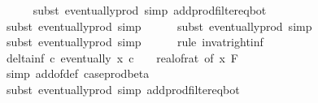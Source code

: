 \begin{isabellebody}
\ \ \ \ \isamarkupfalse%
\ {\isacharparenleft}{\kern0pt}subst\ eventually{\isacharunderscore}{\kern0pt}prod{}{\isacharprime}{\kern0pt}{\isacharcomma}{\kern0pt}\ simp\ add{\isacharcolon}{\kern0pt}prod{\isacharunderscore}{\kern0pt}filter{\isacharunderscore}{\kern0pt}eq{\isacharunderscore}{\kern0pt}bot{\isacharparenright}{\kern0pt}\isanewline
\ \ \ \ \isamarkupfalse%
\ {\isacharparenleft}{\kern0pt}subst\ eventually{\isacharunderscore}{\kern0pt}prod{}{\isacharprime}{\kern0pt}{\isacharcomma}{\kern0pt}\ simp{\isacharparenright}{\kern0pt}\isanewline
\ \ \ \ \isamarkupfalse%
\ {\isacharparenleft}{\kern0pt}subst\ eventually{\isacharunderscore}{\kern0pt}prod{}{\isacharprime}{\kern0pt}{\isacharcomma}{\kern0pt}\ simp{\isacharparenright}{\kern0pt}\isanewline
\ \ \ \ \isamarkupfalse%
\ {\isacharparenleft}{\kern0pt}subst\ eventually{\isacharunderscore}{\kern0pt}prod{}{\isacharprime}{\kern0pt}{\isacharcomma}{\kern0pt}\ simp{\isacharparenright}{\kern0pt}\isanewline
\ \ \ \ \isamarkupfalse%
\ {\isacharparenleft}{\kern0pt}rule\ inv{\isacharunderscore}{\kern0pt}at{\isacharunderscore}{\kern0pt}right{\isacharunderscore}{\kern0pt}{}{\isacharunderscore}{\kern0pt}inf{\isacharparenright}{\kern0pt}\isanewline
\isanewline
\ \ \isamarkupfalse%
\ delta{\isacharunderscore}{\kern0pt}inf{\isacharcolon}{\kern0pt}\ {\isachardoublequoteopen}{\isasymAnd}c{\isachardot}{\kern0pt}\ eventually\ {\isacharparenleft}{\kern0pt}{\isasymlambda}x{\isachardot}{\kern0pt}\ c\ {\isasymle}\ {}\ {\isacharslash}{\kern0pt}\ {\isacharparenleft}{\kern0pt}real{\isacharunderscore}{\kern0pt}of{\isacharunderscore}{\kern0pt}rat\ {\isacharparenleft}{\kern0pt}{\isasymdelta}{\isacharunderscore}{\kern0pt}of\ x{\isacharparenright}{\kern0pt}{\isacharparenright}{\kern0pt}{\isacharparenright}{\kern0pt}\ {\isacharquery}{\kern0pt}F{\isachardoublequoteclose}\isanewline
\ \ \ \ \isamarkupfalse%
\ {\isacharparenleft}{\kern0pt}simp\ add{\isacharcolon}{\kern0pt}{\isasymdelta}{\isacharunderscore}{\kern0pt}of{\isacharunderscore}{\kern0pt}def\ case{\isacharunderscore}{\kern0pt}prod{\isacharunderscore}{\kern0pt}beta{\isacharprime}{\kern0pt}{\isacharparenright}{\kern0pt}\isanewline
\ \ \ \ \isamarkupfalse%
\ {\isacharparenleft}{\kern0pt}subst\ eventually{\isacharunderscore}{\kern0pt}prod{}{\isacharprime}{\kern0pt}{\isacharcomma}{\kern0pt}\ simp\ add{\isacharcolon}{\kern0pt}prod{\isacharunderscore}{\kern0pt}filter{\isacharunderscore}{\kern0pt}eq{\isacharunderscore}{\kern0pt}bot{\isacharparenright}{\kern0pt}\isanewline

\end{isabellebody}

